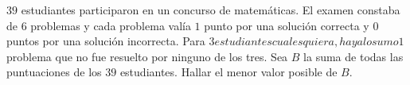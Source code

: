 $39$ estudiantes participaron en un concurso de matemáticas. El examen constaba de $6$ problemas y cada problema valía $1$ punto por una solución correcta y $0$ puntos por una solución incorrecta. Para 3$ estudiantes cualesquiera, hay a lo sumo 1$ problema que no fue resuelto por ninguno de los tres. Sea $B$ la suma de todas las puntuaciones de los $39$ estudiantes. Hallar el menor valor posible de $B$.
